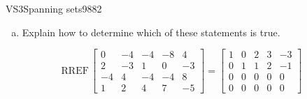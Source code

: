 \begin{exercise}{VS3}{Spanning sets}{9882}
\begin{exerciseStatement}
\begin{enumerate}[(a)]
\begin{itemize}
 The set of vectors \(\left\{ \left[\begin{array}{c}
0 \\
2 \\
-4 \\
1
\end{array}\right] , \left[\begin{array}{c}
-4 \\
-3 \\
4 \\
2
\end{array}\right] , \left[\begin{array}{c}
-4 \\
1 \\
-4 \\
4
\end{array}\right] , \left[\begin{array}{c}
-8 \\
0 \\
-4 \\
7
\end{array}\right] , \left[\begin{array}{c}
4 \\
-3 \\
8 \\
-5
\end{array}\right] \right\}\) does \textbf{not} span \(\mathbb R^4\). 

 
\end{itemize}

     
\item  

 Explain how to determine which of these statements is true. 

 
\end{enumerate}

     \end{exerciseStatement}
 \begin{exerciseAnswer} 

 \[
\mathrm{RREF}\, \left[\begin{array}{ccccc}
0 & -4 & -4 & -8 & 4 \\
2 & -3 & 1 & 0 & -3 \\
-4 & 4 & -4 & -4 & 8 \\
1 & 2 & 4 & 7 & -5
\end{array}\right] = \left[\begin{array}{ccccc}
1 & 0 & 2 & 3 & -3 \\
0 & 1 & 1 & 2 & -1 \\
0 & 0 & 0 & 0 & 0 \\
0 & 0 & 0 & 0 & 0
\end{array}\right]
            \] 


\end{exerciseAnswer}
\end{exercise}
